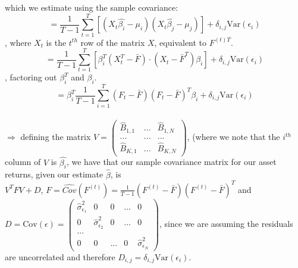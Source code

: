 \documentclass{article}
\begin{document}
which we estimate using the sample covariance:\\

\[= \frac{1}{T-1} \sum_{t=1}^T [(X_t\hat{\beta_i} - \mu_i)(X_t\hat{\beta_j}-\mu_j)] + \delta_{i,j}\text{Var}(\epsilon_i)\], where $X_t$ is the $t^{th}$ row of the matrix $X$, equivalent to $F^{(t)T}$.\\

\[= \frac{1}{T-1} \sum_{t=1}^T [\beta_i^T(X_t^T - \bar{F}) \cdot (X_t - \bar{F}^T)\beta_i] + \delta_{i,j}\text{Var}(\epsilon_i)\], factoring out $\beta_i^T$ and $\beta_i$.\\

\[= \beta_i^T \frac{1}{T-1} \sum_{i=1}^T (F_t - \bar{F})(F_t - \bar{F})^T \beta_i + \delta_{i,j}\text{Var}(\epsilon_i)\]\\

$\Rightarrow$ defining the matrix $V = \begin{pmatrix} \hat{B}_{1,1} & ... & \hat{B}_{1,N}\\
... & ... & ...\\
\hat{B}_{K,1} & ... & \hat{B}_{K,N} \end{pmatrix}$, (where we note that the $i^{th}$ column of $V$ is $\hat{\beta_i}$, we have that our sample covariance matrix for our asset returns, given our estimate $\hat{\beta}$, is\\

$V^TFV + D$, $F = \hat{Cov}(F^{(t)}) = \frac{1}{T-1}(F^{(t)}-\bar{F})(F^{(t)}-\bar{F})^T$ and $D = \text{Cov}(\epsilon) = 
\begin{pmatrix}
\hat{\sigma}_{\epsilon_1}^2 & 0 & 0 &... & 0\\
0 & \hat{\sigma}_{\epsilon_2}^2 & 0  & ... & 0\\
...\\
0 & 0 &  ... & 0 & \hat{\sigma}_{\epsilon_N}^2 \end{pmatrix}$, since we are assuming the residuals are uncorrelated and therefore $D_{i,j} = \delta_{i,j}\text{Var}(\epsilon_i)$.\\
\end{document}

